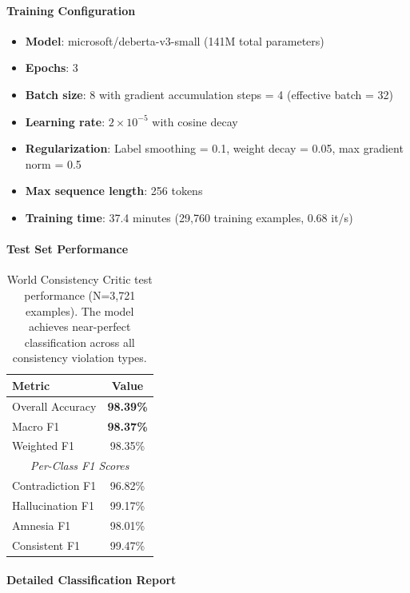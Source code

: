 \documentclass[11pt]{article}
\begin{document}
\paragraph{Training Configuration}
\begin{itemize}
    \item \textbf{Model}: microsoft/deberta-v3-small (141M total parameters)
    \item \textbf{Epochs}: 3
    \item \textbf{Batch size}: 8 with gradient accumulation steps = 4 (effective batch = 32)
    \item \textbf{Learning rate}: $2 \times 10^{-5}$ with cosine decay
    \item \textbf{Regularization}: Label smoothing = 0.1, weight decay = 0.05, max gradient norm = 0.5
    \item \textbf{Max sequence length}: 256 tokens
    \item \textbf{Training time}: 37.4 minutes (29,760 training examples, 0.68 it/s)
\end{itemize}

\paragraph{Test Set Performance}
\begin{table}[h]
\centering
\begin{tabular}{lc}
\toprule
\textbf{Metric} & \textbf{Value} \\
\midrule
Overall Accuracy & \textbf{98.39\%} \\
Macro F1 & \textbf{98.37\%} \\
Weighted F1 & 98.35\% \\
\midrule
\multicolumn{2}{c}{\textit{Per-Class F1 Scores}} \\
\midrule
Contradiction F1 & 96.82\% \\
Hallucination F1 & 99.17\% \\
Amnesia F1 & 98.01\% \\
Consistent F1 & 99.47\% \\
\bottomrule
\end{tabular}
\caption{World Consistency Critic test performance (N=3,721 examples). The model achieves near-perfect classification across all consistency violation types.}
\label{tab:world_performance}
\end{table}

\paragraph{Detailed Classification Report}
\end{document}

